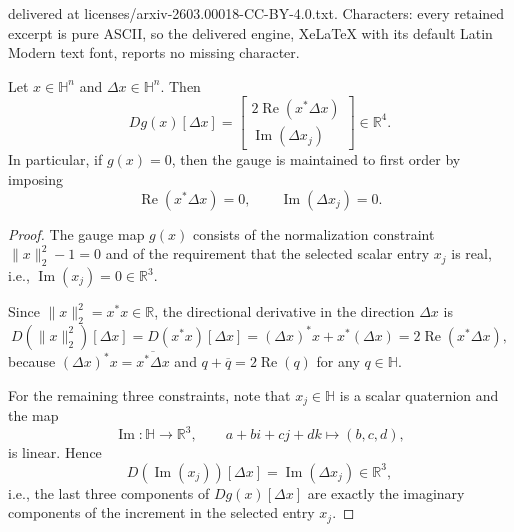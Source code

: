 \documentclass[10pt,a4paper]{amsart}
\def\i{i}\def\j{j}\def\k{k}%
\def\j{j}\def\k{k}%
\def\k{k}%
\newcommand{\HH}{\mathbb{H}}
\newcommand{\RR}{\mathbb{R}}
\renewcommand{\Im}{\operatorname{Im}}
\renewcommand{\Re}{\operatorname{Re}}
\begin{document}
delivered at licenses/arxiv-2603.00018-CC-BY-4.0.txt. Characters: every retained excerpt is pure ASCII, so the delivered engine, XeLaTeX with its default Latin Modern text font, reports no missing character.
\begin{Lem}
\label{lem_linearized_gauge}
Let $x\in\HH^n$ and $\Delta x\in\HH^n$. Then
\[
Dg(x)[\Delta x]=
\begin{bmatrix}
2\Re(x^\ast \Delta x)\\[0.3mm]
\Im(\Delta x_j)
\end{bmatrix}\in\RR^4.
\]
In particular, if $g(x)=0$, then the gauge is maintained to first order by imposing
\begin{equation}
\label{eq_newton_gauge_lin}
\Re(x^\ast \Delta x)=0,\qquad \Im(\Delta x_j)=0.
\end{equation}
\end{Lem}

\begin{proof}
The gauge map $g(x)$ consists of the normalization constraint $\|x\|_2^2-1=0$ and of the requirement that the selected
scalar entry $x_j$ is real, i.e., $\Im(x_j)=0\in\RR^3$.

Since $\|x\|_2^2=x^\ast x\in\RR$, the directional derivative in the direction $\Delta x$ is
\[
D(\|x\|_2^2)[\Delta x]
= D(x^\ast x)[\Delta x]
= (\Delta x)^\ast x + x^\ast(\Delta x)
= 2\Re(x^\ast\Delta x),
\]
because $(\Delta x)^\ast x=\overline{x^\ast\Delta x}$ and $q+\overline{q}=2\Re(q)$ for any $q\in\HH$.

For the remaining three constraints, note that $x_j\in\HH$ is a scalar quaternion and the map
\[
\Im:\HH\to\RR^3,\qquad a+b\i+c\j+d\k \mapsto (b,c,d),
\]
is linear. Hence
\[
D(\Im(x_j))[\Delta x]=\Im(\Delta x_j)\in\RR^3,
\]
i.e., the last three components of $Dg(x)[\Delta x]$ are exactly the imaginary components of the increment in the selected entry $x_j$.
\end{proof}
\end{document}
